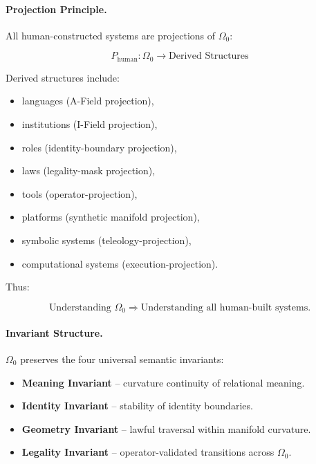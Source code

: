 \paragraph{Projection Principle.}
All human-constructed systems are projections of $\Omega_0$:



\[
P_{\text{human}} : \Omega_0 \rightarrow \text{Derived Structures}
\]



Derived structures include:

\begin{itemize}[leftmargin=1.2cm]
    \item languages (A-Field projection),
    \item institutions (I-Field projection),
    \item roles (identity-boundary projection),
    \item laws (legality-mask projection),
    \item tools (operator-projection),
    \item platforms (synthetic manifold projection),
    \item symbolic systems (teleology-projection),
    \item computational systems (execution-projection).
\end{itemize}

Thus:



\[
\text{Understanding } \Omega_0 \Rightarrow \text{Understanding all human-built systems}.
\]



\paragraph{Invariant Structure.}
$\Omega_0$ preserves the four universal semantic invariants:

\begin{itemize}[leftmargin=1.2cm]
    \item \textbf{Meaning Invariant} -- curvature continuity of relational meaning.
    \item \textbf{Identity Invariant} -- stability of identity boundaries.
    \item \textbf{Geometry Invariant} -- lawful traversal within manifold curvature.
    \item \textbf{Legality Invariant} -- operator-validated transitions across $\Omega_0$.
\end{itemize}

